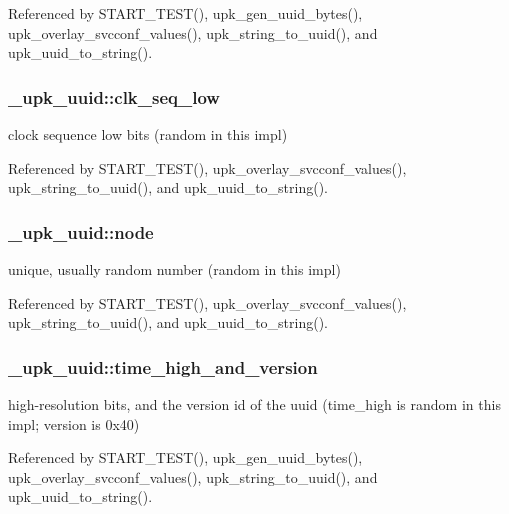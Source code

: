 Referenced by START\_\-TEST(), upk\_\-gen\_\-uuid\_\-bytes(), upk\_\-overlay\_\-svcconf\_\-values(), upk\_\-string\_\-to\_\-uuid(), and upk\_\-uuid\_\-to\_\-string().

\subsubsection[{clk\_\-seq\_\-low}]{ {\bf \_\-upk\_\-uuid::clk\_\-seq\_\-low}}\label{struct__upk__uuid_a0cdb0fa230c786e2ae9994ce31df60fd}
clock sequence low bits (random in this impl) 

Referenced by START\_\-TEST(), upk\_\-overlay\_\-svcconf\_\-values(), upk\_\-string\_\-to\_\-uuid(), and upk\_\-uuid\_\-to\_\-string().

\subsubsection[{node}]{ {\bf \_\-upk\_\-uuid::node}}\label{struct__upk__uuid_afe8efc1a9931d9469bbfb692d8db729a}
unique, usually random number (random in this impl) 

Referenced by START\_\-TEST(), upk\_\-overlay\_\-svcconf\_\-values(), upk\_\-string\_\-to\_\-uuid(), and upk\_\-uuid\_\-to\_\-string().

\subsubsection[{time\_\-high\_\-and\_\-version}]{ {\bf \_\-upk\_\-uuid::time\_\-high\_\-and\_\-version}}\label{struct__upk__uuid_abd1232f0887919e662a772b94b465670}
high-\/resolution bits, and the version id of the uuid (time\_\-high is random in this impl; version is 0x40) 

Referenced by START\_\-TEST(), upk\_\-gen\_\-uuid\_\-bytes(), upk\_\-overlay\_\-svcconf\_\-values(), upk\_\-string\_\-to\_\-uuid(), and upk\_\-uuid\_\-to\_\-string().

